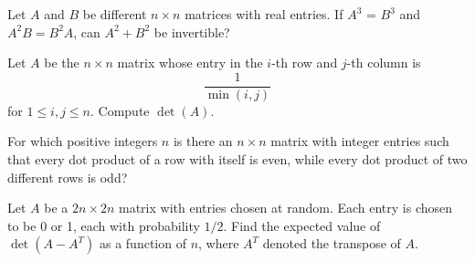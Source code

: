 \documentclass{article}
\begin{document}
        \begin{exercise}[1991 A2]
        Let $A$ and $B$ be different $n \times n$ matrices with real entries. If $A^{3}$ = $B^{3}$ and $A^{2}B = B^{2}A$, can $A^{2} + B^{2}$ be invertible?
    \end{exercise}
    
        \begin{exercise}[2014 A2]
        Let $A$ be the $n \times n$ matrix whose entry in the $i$-th row and $j$-th column is
        \[\frac{1}{\min(i, j)}
        \]
        for $1 \leq i, j \leq n$. Compute $\det(A)$.
    \end{exercise}
    
    
    
    \begin{exercise}[2011 A4]
        For which positive integers $n$ is there an $n \times n$ matrix with integer entries such that every dot product of a row with itself is even, while every dot product of two different rows is odd?
    \end{exercise}
    
    \begin{exercise}[2016 B4]
        Let \(A\) be a \(2n\times 2n\) matrix with entries chosen at random.
        Each entry is chosen to be 0 or 1, each with probability \(1/2\).
        Find the expected value of \(\det(A-A^T)\) as a function of \(n\), where \(A^T\) denoted the transpose of \(A\).
    \end{exercise}
\end{document}
